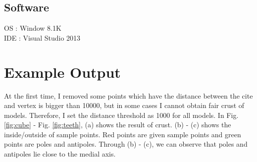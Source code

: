 \documentclass[11pt]{article}
\begin{document}
\subsection{Software}
OS : Window 8.1K\\
IDE : Visual Studio 2013\\

\section{Example Output} \label{Example}
At the first time, I removed some points which have the distance between the cite and vertex is bigger than 10000, but in some cases I cannot obtain fair crust of models. 
Therefore, I set the distance threshold as 1000 for all models. In Fig. \ref{fig:cube} - Fig. \ref{fig:teeth}, (a) shows the result of crust. (b) - (c) shows the inside/outside of sample points. Red points are given sample points and green points are poles and antipoles. Through (b) - (c), we can observe that poles and antipoles lie close to the medial axis. 
\end{document}
